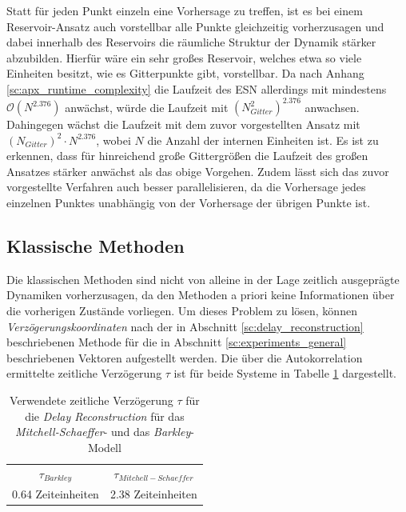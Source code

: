 Statt für jeden Punkt einzeln eine Vorhersage zu treffen, ist es bei einem Reservoir-Ansatz auch vorstellbar alle Punkte gleichzeitig vorherzusagen und dabei innerhalb des Reservoirs die räumliche Struktur der Dynamik stärker abzubilden. Hierfür wäre ein sehr großes Reservoir, welches etwa so viele Einheiten besitzt, wie es Gitterpunkte gibt, vorstellbar. Da nach Anhang \ref{sc:apx_runtime_complexity} die Laufzeit des \textsc{ESN} allerdings mit mindestens $\mathcal{O}(N^{2.376})$ anwächst, würde die Laufzeit mit $(N_{Gitter}^2)^{2.376}$ anwachsen. Dahingegen wächst die Laufzeit mit dem zuvor vorgestellten Ansatz mit $(N_{Gitter})^2 \cdot N^{2.376}$, wobei $N$ die Anzahl der internen Einheiten ist. Es ist zu erkennen, dass für hinreichend große Gittergrößen die Laufzeit des großen Ansatzes stärker anwächst als das obige Vorgehen. Zudem lässt sich das zuvor vorgestellte Verfahren auch besser parallelisieren, da die Vorhersage jedes einzelnen Punktes unabhängig von der Vorhersage der übrigen Punkte ist.   

\FloatBarrier
\subsection{Klassische Methoden}
Die klassischen Methoden sind nicht von alleine in der Lage zeitlich ausgeprägte Dynamiken vorherzusagen, da den Methoden a priori keine Informationen über die vorherigen Zustände vorliegen. Um dieses Problem zu lösen, können \textit{Verzögerungskoordinaten} nach der in Abschnitt \ref{sc:delay_reconstruction} beschriebenen Methode für die in Abschnitt \ref{sc:experiments_general} beschriebenen Vektoren aufgestellt werden. Die über die Autokorrelation ermittelte zeitliche Verzögerung $\tau$ ist für beide Systeme in Tabelle \ref{tab:delay_reconstruction_tau} dargestellt.     

\begin{table}[h]
\centering
\begin{tabular}{cc}
\hline
$\tau_{Barkley}$ & $\tau_{Mitchell-Schaeffer}$ \\ 
0.64 Zeiteinheiten & 2.38 Zeiteinheiten\\ 
\hline 
\end{tabular} 
\caption{Verwendete zeitliche Verzögerung $\tau$ für die \textit{Delay Reconstruction} für das \textit{Mitchell-Schaeffer}- und das \textit{Barkley}-Modell}
\label{tab:delay_reconstruction_tau}
\end{table} 



